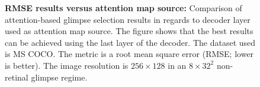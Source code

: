 \begin{figure}[t]
\begin{center}
\begin{small}
\begin{sc}

\end{sc}
\end{small}
\end{center}

\caption{\textbf{RMSE results versus attention map source:} Comparison of attention-based glimpse selection results in regards to decoder layer used as attention map source. The figure shows that the best results can be achieved using the last layer of the decoder. The dataset used is MS COCO. The metric is a root mean square error (RMSE; lower is better). The image resolution is $256\times128$ in an $8\times32^2$ non-retinal glimpse regime.}
\label{fig:attention-layer}
\end{figure}